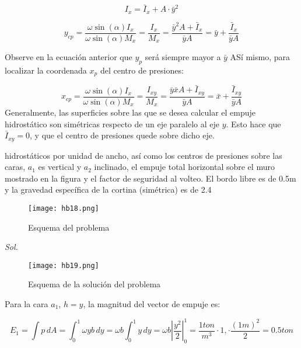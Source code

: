 \begin{equation}
    I_x=\bar{I}_x+A\cdot \bar{y}^{2}
\end{equation}

\begin{equation*}
    y_{cp}=\frac{\omega\sin{( \alpha )}I_x}{\omega\sin{( \alpha )}M_x}=\frac{I_x}{M_x}=\frac{\bar{y}^2A+\bar{I}_x}{\bar{y}A}=\bar{y}+\frac{\bar{I}_x}{\bar{y}A}
\end{equation*}

Observe en la ecuación anterior que $y_p$ será siempre mayor a $\bar{y}$ ASí mismo, para localizar la coordenada $x_p$ del centro de presiones: 

\begin{equation*}
    x_{cp}=\frac{\omega\sin{( \alpha )}I_x}{\omega\sin{( \alpha )}M_x}=\frac{I_{xy}}{M_x}=\frac{\bar{y}\bar{x}A+\bar{I}_{xy}}{\bar{y}A}=\bar{x}+\frac{\bar{I}_{xy}}{\bar{y}A}
\end{equation*}
Generalmente, las superficies sobre las que se desea calcular el empuje hidrostático son simétricas respecto de un eje paralelo al eje $y$. Esto hace que $\bar{I}_{xy}=0$, y que el centro de presiones quede sobre dicho eje. 

\begin{problem}
    hidrostáticos por unidad de ancho, así como los centros de presiones sobre las caras, $a_1$ es vertical y $a_2$ inclinado, el empuje total horizontal sobre el muro mostrado en la figura y el factor de seguridad al volteo. El bordo libre es de 0.5m y la gravedad específica de la cortina (simétrica) es de 2.4
\end{problem}

\begin{figure}[h!]
\centering
  \texttt{[image: hb18.png]}
  \caption{Esquema del problema}
  \label{hb18}
\end{figure}

\textit{ Sol. }

\begin{figure}[h!]
\centering
  \texttt{[image: hb19.png]}
  \caption{Esquema de la solución del problema}
  \label{hb19}
\end{figure}

Para la cara $a_1$, $h=y$, la magnitud del vector de empuje es: 

\begin{equation*}
    E_1=\int p\, dA=\int_0^1\omega yb\,dy=\omega b\int_0^1y\, dy=\omega b\left\lvert \frac{y^2}{2}\right\rvert_0^1=\frac{1ton}{m^3}\cdot 1,\cdot\frac{(1m)^2}{2}=0.5ton
\end{equation*}

